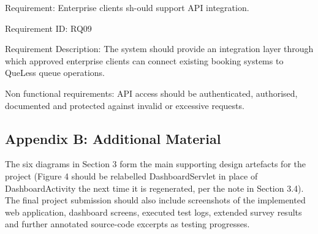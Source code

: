 \documentclass[
]{article}
\begin{document}
Requirement: Enterprise clients sh-ould support API integration.

Requirement ID: RQ09

Requirement Description: The system should provide an integration layer
through which approved enterprise clients can connect existing booking
systems to QueLess queue operations.

Non functional requirements: API access should be authenticated,
authorised, documented and protected against invalid or excessive
requests.

\subsection{Appendix B: Additional
Material}\label{appendix-b-additional-material}

The six diagrams in Section 3 form the main supporting design artefacts
for the project (Figure 4 should be relabelled DashboardServlet in place
of DashboardActivity the next time it is regenerated, per the note in
Section 3.4). The final project submission should also include
screenshots of the implemented web application, dashboard screens,
executed test logs, extended survey results and further annotated
source-code excerpts as testing progresses.
\end{document}
